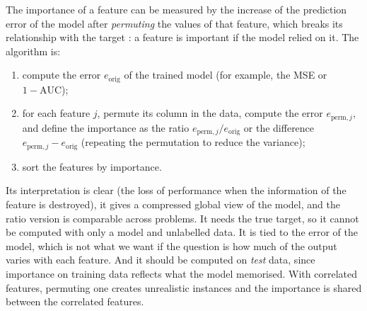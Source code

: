 The importance of a feature can be measured by the increase of the prediction error of the model
after \emph{permuting} the values of that feature, which breaks its relationship with the target
\citep{breiman2001random,fisher2019all}: a feature is important if the model relied on it. The
algorithm is:
\begin{enumerate}
  \item compute the error $e_{\text{orig}}$ of the trained model (for example, the MSE or $1-\mathrm{AUC}$);
  \item for each feature $j$, permute its column in the data, compute the error $e_{\text{perm},j}$,
        and define the importance as the ratio $e_{\text{perm},j}/e_{\text{orig}}$ or the difference
        $e_{\text{perm},j}-e_{\text{orig}}$ (repeating the permutation to reduce the variance);
  \item sort the features by importance.
\end{enumerate}
Its interpretation is clear (the loss of performance when the information of the feature is
destroyed), it gives a compressed global view of the model, and the ratio version is comparable
across problems. It needs the true target, so it cannot be computed with only a model and unlabelled
data. It is tied to the error of the model, which is not what we want if the question is how much of
the output varies with each feature. And it should be computed on \emph{test} data, since importance
on training data reflects what the model memorised. With correlated features, permuting one creates
unrealistic instances and the importance is shared between the correlated features.

